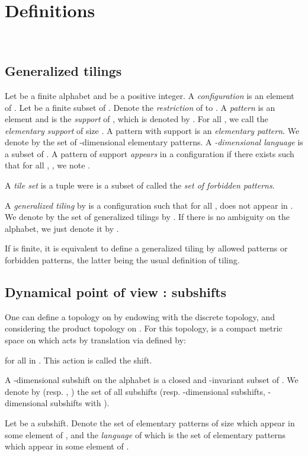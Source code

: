 \documentclass[proceedings]{stacs}
\theoremstyle{plain}\newtheorem{satz}[thm]{Satz}
\theoremstyle{definition}\newtheorem{crucial}[thm]{Crucial Definition}
\begin{document}
\section{Definitions}~\label{definition}
\vspace{-0,6cm}
	\subsection{Generalized tilings}

Let  be a finite alphabet and  be a positive integer. A \emph{configuration}  is an element of . Let  be a finite subset of . Denote  the \emph{restriction} of  to . A \emph{pattern} is an element   and  is the \emph{support} of , which is denoted by . For all , we call  the \emph{elementary support} of size . A pattern with support  is an \emph{elementary pattern}. We denote by  the set of -dimensional elementary patterns. A \emph{-dimensional language}  is a subset of . A pattern  of support  \emph{appears} in a configuration  if there exists  such that for all , , we note .

\begin{definition}
A \emph{tile set} is a tuple  were  is a subset of  called the \emph{set of forbidden patterns}.

A \emph{generalized tiling} by  is a configuration  such that for all ,  does not appear in . We denote by  the set of generalized tilings by . If there is no ambiguity on the alphabet, we just denote it by .
\end{definition}

\begin{remark}
If  is finite, it is equivalent to define a generalized tiling by allowed patterns or forbidden patterns, the latter being the usual definition of tiling.
\end{remark}

             \subsection{Dynamical point of view : subshifts}

One can define a topology on  by endowing  with the discrete topology, and considering the product topology on . For this topology,   is a compact metric space on which  acts by translation via  defined by: 

for all  in . This action is called the shift.

\begin{definition}\label{language}
A -dimensional subshift on the alphabet  is a closed and -invariant subset of . We denote by  (resp. , ) the set of all subshifts (resp. -dimensional subshifts, -dimensional subshifts with ). 

Let  be a subshift. Denote  the set of elementary patterns of size  which appear in some element of , and  the \emph{language} of  which is the set of elementary patterns which appear in some element of  .
\end{definition}
\end{document}
